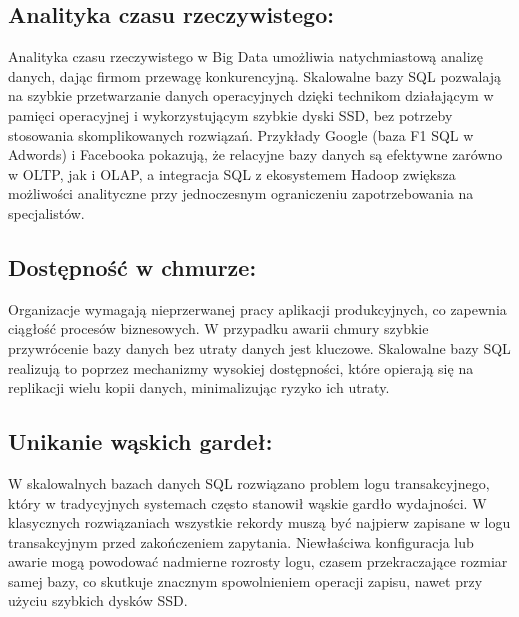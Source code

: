 \documentclass[a4paper,11pt,openany,english]{sphinxmanual}
\begin{document}
\subsection{Analityka czasu rzeczywistego:}
\label{\detokenize{rozdzial2/index:analityka-czasu-rzeczywistego}}
\sphinxAtStartPar
Analityka czasu rzeczywistego w Big Data umożliwia natychmiastową analizę danych, dając firmom przewagę konkurencyjną. Skalowalne bazy SQL pozwalają na szybkie przetwarzanie danych operacyjnych dzięki technikom działającym w pamięci operacyjnej i wykorzystującym szybkie dyski SSD, bez potrzeby stosowania skomplikowanych rozwiązań. Przykłady Google (baza F1 SQL w Adwords) i Facebooka pokazują, że relacyjne bazy danych są efektywne zarówno w OLTP, jak i OLAP, a integracja SQL z ekosystemem Hadoop zwiększa możliwości analityczne przy jednoczesnym ograniczeniu zapotrzebowania na specjalistów.


\subsection{Dostępność w chmurze:}
\label{\detokenize{rozdzial2/index:dostepnosc-w-chmurze}}
\sphinxAtStartPar
Organizacje wymagają nieprzerwanej pracy aplikacji produkcyjnych, co zapewnia ciągłość procesów biznesowych. W przypadku awarii chmury szybkie przywrócenie bazy danych bez utraty danych jest kluczowe. Skalowalne bazy SQL realizują to poprzez mechanizmy wysokiej dostępności, które opierają się na replikacji wielu kopii danych, minimalizując ryzyko ich utraty.


\subsection{Unikanie wąskich gardeł:}
\label{\detokenize{rozdzial2/index:unikanie-waskich-gardel}}
\sphinxAtStartPar
W skalowalnych bazach danych SQL rozwiązano problem logu transakcyjnego, który w tradycyjnych systemach często stanowił wąskie gardło wydajności. W klasycznych rozwiązaniach wszystkie rekordy muszą być najpierw zapisane w logu transakcyjnym przed zakończeniem zapytania. Niewłaściwa konfiguracja lub awarie mogą powodować nadmierne rozrosty logu, czasem przekraczające rozmiar samej bazy, co skutkuje znacznym spowolnieniem operacji zapisu, nawet przy użyciu szybkich dysków SSD.
\end{document}

